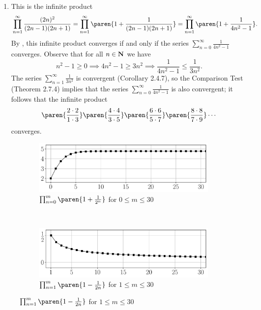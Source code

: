 \documentclass{lew98_solutions}
\begin{document}
\begin{solution}
\begin{enumerate}
        \item This is the infinite product
        \[
            \prod_{n=1}^{\infty} \frac{(2n)^2}{(2n - 1)(2n + 1)} = \prod_{n=1}^{\infty} \paren{ 1 + \frac{1}{(2n - 1)(2n + 1)} } = \prod_{n=1}^{\infty} \paren{ 1 + \frac{1}{4n^2 - 1} }.
        \]
        By , this infinite product converges if and only if the series \( \sum_{n=0}^{\infty} \tfrac{1}{4n^2 - 1} \) converges. Observe that for all \( n \in \mathbf{N} \) we have
        \[
            n^2 - 1 \geq 0 \implies 4 n^2 - 1 \geq 3 n^2 \implies \frac{1}{4 n^2 - 1} \leq \frac{1}{3 n^2}.
        \]
        The series \( \sum_{n=1}^{\infty} \tfrac{1}{3 n^2} \) is convergent (Corollary 2.4.7), so the Comparison Test (Theorem 2.7.4) implies that the series \( \sum_{n=0}^{\infty} \tfrac{1}{4n^2 - 1} \) is also convergent; it follows that the infinite product
        \[
            \paren{ \frac{2 \cdot 2}{1 \cdot 3} } \paren{ \frac{4 \cdot 4}{3 \cdot 5} } \paren{ \frac{6 \cdot 6}{5 \cdot 7} } \paren{ \frac{8 \cdot 8}{7 \cdot 9} } \cdots
        \]
        converges.
    \end{enumerate}
    \begin{figure}
        \centering
        \begin{subfigure}{0.9\textwidth}
            \includegraphics[width=\textwidth]{UA_Figures/UA_ex2_7_10_fig_a.pdf}
            \caption{\( \prod_{n=0}^m \paren{ 1 + \frac{1}{2^n} } \) for \( 0 \leq m \leq 30 \)}
        \end{subfigure} \\
        \begin{subfigure}{0.9\textwidth}
            \includegraphics[width=\textwidth]{UA_Figures/UA_ex2_7_10_fig_b.pdf}
            \caption{\( \prod_{n=1}^m \paren{ 1 - \frac{1}{2n} } \) for \( 1 \leq m \leq 30 \)}

\end{subfigure}
\end{figure}
\end{solution}
\end{document}
